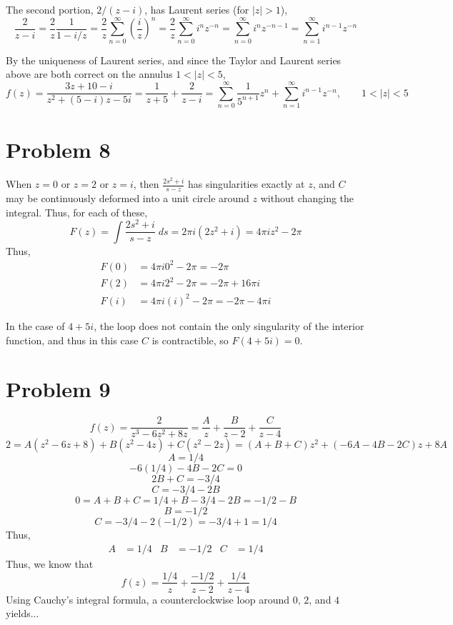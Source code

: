 \documentclass{article}
\theoremstyle{definition}
\newcommand{\p}[1]{\left(#1\right)}
\newcommand{\abs}[1]{\left|#1\right|}
\begin{document}
The second portion, $2/(z-i)$, has Laurent series (for $\abs{z} > 1$),
\[
\frac{2}{z-i} 
= \frac{2}{z} \frac{1}{1-i/z}
= \frac{2}{z} \sum_{n=0}^\infty \p{\frac{i}{z}}^n
= \frac{2}{z} \sum_{n=0}^\infty i^n z^{-n}
= \sum_{n=0}^\infty i^n z^{-n-1}
= \sum_{n=1}^\infty i^{n-1} z^{-n}
\]

By the uniqueness of Laurent series, 
and since the Taylor and Laurent series above are both correct on the annulus
$1 < \abs{z} < 5$, 
\[
f(z) 
= \frac{3z+10-i}{z^2+(5-i)z-5i}
= \frac{1}{z+5} + \frac{2}{z-i}
= \sum_{n=0}^\infty \frac{1}{5^{n+1}} z^n
+ \sum_{n=1}^\infty i^{n-1} z^{-n}, 
\qquad 1 < \abs{z} < 5
\]

\section{Problem 8}
\begin{figure}[h!]
\centering
{}
\end{figure}
When $z=0$ or $z=2$ or $z=i$, then $\frac{2s^2+i}{s-z}$ has singularities exactly at $z$, and 
$C$ may be continuously deformed into a unit circle around $z$ without changing the integral. Thus,
for each of these,
\[ F(z) = \int \frac{2 s^2 + i}{s-z} \;ds = 2 \pi i (2 z^2 + i) = 4 \pi i z^2 - 2 \pi \]
Thus,
\begin{align*}
F(0) &= 4 \pi i 0^2 - 2\pi = -2\pi \\
F(2) &= 4 \pi i 2^2 - 2 \pi = -2 \pi + 16 \pi i \\
F(i) &= 4 \pi i (i)^2 - 2 \pi = -2\pi - 4 \pi i 
\end{align*}

In the case of $4+5i$, the loop does not contain the only singularity of the interior function, 
and thus in this case $C$ is contractible, so $F(4+5i)=0$.

\section{Problem 9}
\[ 
f(z)
= \frac{2}{z^3-6z^2+8z}
= \frac{A}{z} + \frac{B}{z-2} + \frac{C}{z-4}
\]
\[
2 
= A (z^2-6z+8) + B (z^2-4z) + C(z^2-2z)
= (A+B+C)z^2 + (-6A-4B-2C)z + 8A
\]
\[ A = 1/4 \]
\[ -6 (1/4) -4B -2C = 0 \]
\[ 2B+C=-3/4 \]
\[ C=-3/4 - 2B \]
\[ 0 = A+B+C = 1/4 + B -3/4-2B =-1/2-B\]
\[ B=-1/2 \]
\[ C=-3/4 - 2(-1/2) = -3/4 +1 = 1/4 \]
Thus,
\begin{align*}
A &= 1/4 & B &= -1/2 & C &= 1/4
\end{align*}
Thus, we know that
\[ 
f(z) 
= \frac{1/4}{z} + \frac{-1/2}{z-2} + \frac{1/4}{z-4} 
\]
Using Cauchy's integral formula, a counterclockwise loop around $0$, $2$, and $4$
yields...
\end{document}
